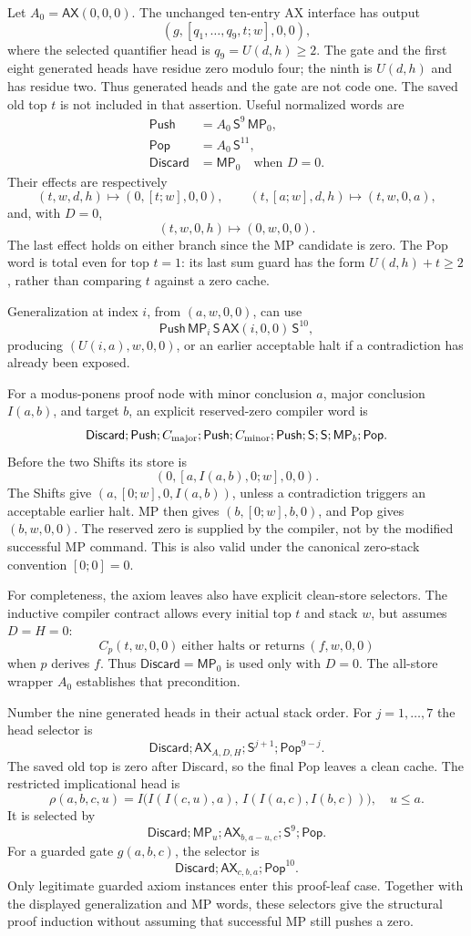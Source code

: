 \documentclass[11pt,a4paper]{article}
\newcommand{\MP}{\mathsf{MP}}
\newcommand{\AX}{\mathsf{AX}}
\newcommand{\Shift}{\mathsf{S}}
\begin{document}
Let $A_0=\AX(0,0,0)$. The unchanged ten-entry AX interface has output
\[
   (g,[q_1,\ldots,q_9,t;w],0,0),
\]
where the selected quantifier head is $q_9=U(d,h)\ge2$.
The gate and the first eight generated heads have residue zero modulo four; the ninth is $U(d,h)$ and has residue two. Thus generated heads and the gate are not code one. The saved old top $t$ is not included in that assertion.
Useful normalized words are
\begin{align*}
 \mathsf{Push}&=A_0\,\Shift^9\,\MP_0,\\
 \mathsf{Pop}&=A_0\,\Shift^{11},\\
 \mathsf{Discard}&=\MP_0\quad\text{when }D=0.
\end{align*}
Their effects are respectively
\[
 (t,w,d,h)\mapsto(0,[t;w],0,0),\qquad
 (t,[a;w],d,h)\mapsto(t,w,0,a),
\]
and, with $D=0$,
\[
 (t,w,0,h)\mapsto(0,w,0,0).
\]
The last effect holds on either branch since the MP candidate is zero.
The Pop word is total even for top $t=1$: its last sum guard has the
form $U(d,h)+t\ge2$, rather than comparing $t$ against a zero cache.

Generalization at index $i$, from $(a,w,0,0)$, can use
\[
 \mathsf{Push}\,\MP_i\,\Shift\,\AX(i,0,0)\,\Shift^{10},
\]
producing $(U(i,a),w,0,0)$, or an earlier acceptable halt if a contradiction
has already been exposed.

For a modus-ponens proof node with minor conclusion $a$, major conclusion
$I(a,b)$, and target $b$, an explicit reserved-zero compiler word is
\[
 \mathsf{Discard};\mathsf{Push};C_{\rm major};\mathsf{Push};
 C_{\rm minor};\mathsf{Push};\Shift;\Shift;\MP_b;\mathsf{Pop}.
\]
Before the two Shifts its store is
\[
 (0,[a,I(a,b),0;w],0,0).
\]
The Shifts give $(a,[0;w],0,I(a,b))$, unless a contradiction triggers an
acceptable earlier halt. MP then gives $(b,[0;w],b,0)$, and Pop gives
$(b,w,0,0)$. The reserved zero is supplied by the compiler, not by the
modified successful MP command. This is also valid under the canonical
zero-stack convention $[0;0]=0$.


For completeness, the axiom leaves also have explicit clean-store selectors.
The inductive compiler contract allows every initial top $t$ and stack $w$,
but assumes $D=H=0$:
\[
 C_p(t,w,0,0)\ \text{either halts or returns}\ (f,w,0,0)
\]
when $p$ derives $f$. Thus $\mathsf{Discard}=\MP_0$ is used only with
$D=0$. The all-store wrapper $A_0$ establishes that precondition.

Number the nine generated heads in their actual stack order. For
$j=1,\ldots,7$ the head selector is
\[
 \mathsf{Discard};\AX_{A,D,H};\Shift^{j+1};
 \mathsf{Pop}^{9-j}.
\]
The saved old top is zero after Discard, so the final Pop leaves a clean
cache. The restricted implicational head is
\[
 \rho(a,b,c,u)=
 I\bigl(I(I(c,u),a),\,I(I(a,c),I(b,c))\bigr),\quad u\le a.
\]
It is selected by
\[
 \mathsf{Discard};\MP_u;\AX_{b,a-u,c};\Shift^9;\mathsf{Pop}.
\]
For a guarded gate $g(a,b,c)$, the selector is
\[
 \mathsf{Discard};\AX_{c,b,a};\mathsf{Pop}^{10}.
\]
Only legitimate guarded axiom instances enter this proof-leaf case.
Together with the displayed generalization and MP words, these selectors
give the structural proof induction without assuming that successful MP
still pushes a zero.
\end{document}
